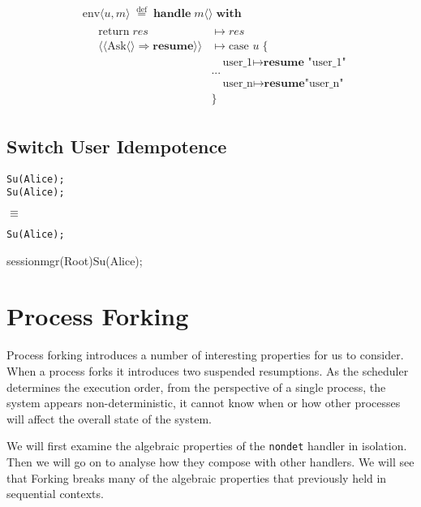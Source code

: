 \documentclass[logo,bsc,singlespacing,parskip]{infthesis}
\begin{document}
\[
\begin{array}{l}
  \quad \text{env} \langle \mathit{u}, m \rangle \;\overset{\mathrm{def}}{=} \;
  \textbf{handle}\; m \langle \rangle\; \textbf{with} \\[0.8em]
  \qquad \begin{array}{ll}
    \text{return}\; res & \mapsto res \\
    \langle\!\langle \text{Ask} \langle \rangle \Rightarrow \textbf{resume} \rangle\!\rangle & \mapsto \text{case }  \mathit{u} \; \{ \\
    & \quad \text{user\_1} \mapsto \textbf{resume } \text{"user\_1"} \\
    & ...\\
    & \quad \text{user\_n} \mapsto \textbf{resume}  \text{"user\_n"} \\
    & \}
  \end{array}
\end{array}
\]



\subsection*{Switch User Idempotence}

\begin{lstlisting}
Su(Alice);
Su(Alice);
\end{lstlisting}
$\equiv$
\begin{lstlisting}
Su(Alice);
\end{lstlisting}

{}{sessionmgr(Root)}{Su(Alice);}

\section{Process Forking}
Process forking introduces a number of interesting properties for us to consider. When a process forks it introduces two suspended resumptions. As the scheduler determines the execution order, from the perspective of a single process, the system appears non-deterministic, it cannot know when or how other processes will affect the overall state of the system.

We will first examine the algebraic properties of the \texttt{nondet} handler in isolation. Then we will go on to analyse how they compose with other handlers. We will see that Forking breaks many of the algebraic properties that previously held in sequential contexts. 
\end{document}
